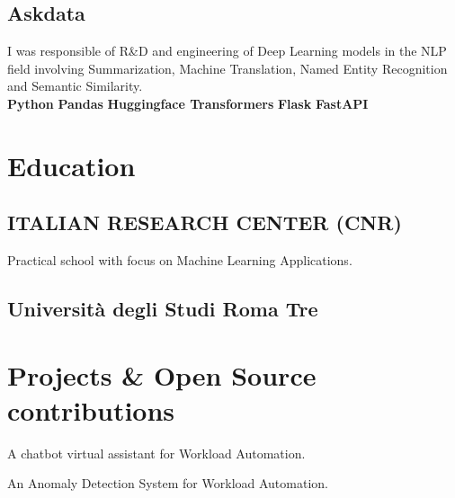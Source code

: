 \documentclass[]{deedy-resume-openfont}
\begin{document}
\begin{minipage}[t]{0.66\textwidth}
\subsection{Askdata}
I was responsible of R\&D and engineering of Deep Learning models in the NLP field involving Summarization, Machine Translation, Named Entity Recognition and Semantic Similarity. \\
\textbf{Python} \textbullet{} \textbf{Pandas} \textbullet{} \textbf{Huggingface Transformers} \textbullet{} \textbf{Flask} \textbullet{} \textbf{FastAPI}
\sectionsep



\section{Education} 

\subsection{ITALIAN RESEARCH CENTER (CNR)}
Practical school with focus on Machine Learning Applications. \\
\sectionsep

\subsection{Università degli Studi Roma Tre}



\section{Projects \& Open Source contributions}

A chatbot virtual assistant for Workload Automation.

An Anomaly Detection System for Workload Automation.


\end{minipage}
\end{document}
